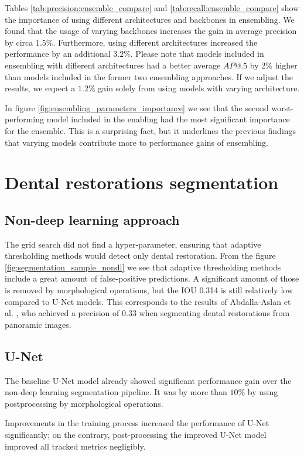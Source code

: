 Tables \ref{tab:precision:ensemble_compare} and \ref{tab:recall:ensemble_compare} show the importance of using different architectures and backbones in ensembling. We found that the usage of varying backbones increases the gain in average precision by circa $1.5\%$. Furthermore, using different architectures increased the performance by an additional $3.2\%$. Please note that models included in ensembling with different architectures had a better average $AP@.5$ by $2\%$ higher than models included in the former two ensembling approaches. If we adjust the results, we expect a $1.2\%$ gain solely from using models with varying architecture.

In figure \ref{fig:ensembling_parameters_importance} we see that the second worst-performing model included in the enabling had the most significant importance for the ensemble. This is a surprising fact, but it underlines the previous findings that varying models contribute more to performance gains of ensembling.

\section{Dental restorations segmentation}
\subsection{Non-deep learning approach}
The grid search did not find a hyper-parameter, ensuring that adaptive thresholding methods would detect only dental restoration. From the figure \ref{fig:segmentation_sample_nondl} we see that adaptive thresholding methods include a great amount of false-positive predictions. A significant amount of those is removed by morphological operations, but the IOU 0.314 is still relatively low compared to U-Net models. This corresponds to the results of Abdalla-Aslan et al. \cite{AbdallaAslan2020}, who achieved a precision of 0.33 when segmenting dental restorations from panoramic images.
\subsection{U-Net}
The baseline U-Net model already showed significant performance gain over the non-deep learning segmentation pipeline. It was by more than $10\%$ by using postprocessing by morphological operations.

Improvements in the training process increased the performance of U-Net significantly; on the contrary, post-processing the improved U-Net model improved all tracked metrics negligibly.

